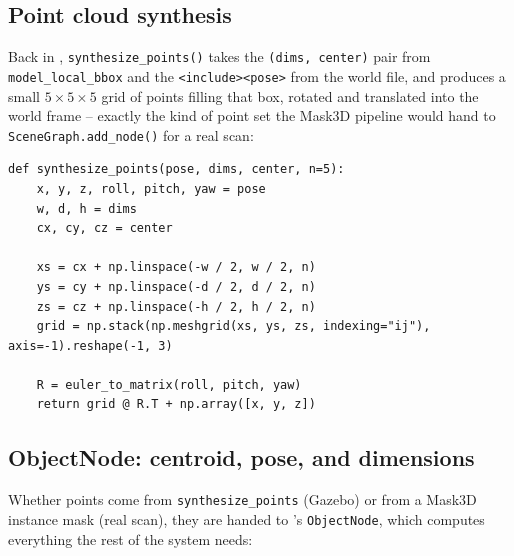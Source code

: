 \documentclass[11pt]{article}
\begin{document}
\subsection{Point cloud synthesis}
\label{sec:synth}

Back in , \texttt{synthesize\_points()}
takes the \texttt{(dims, center)} pair from \texttt{model\_local\_bbox} and the
\texttt{<include><pose>} from the world file, and produces a small
$5\times5\times5$ grid of points filling that box, rotated and translated into
the world frame -- exactly the kind of point set the Mask3D pipeline would
hand to \texttt{SceneGraph.add\_node()} for a real scan:

\begin{lstlisting}[caption={\texttt{build\_scene\_graph\_gazebo.py}: \texttt{synthesize\_points}}]
def synthesize_points(pose, dims, center, n=5):
    x, y, z, roll, pitch, yaw = pose
    w, d, h = dims
    cx, cy, cz = center

    xs = cx + np.linspace(-w / 2, w / 2, n)
    ys = cy + np.linspace(-d / 2, d / 2, n)
    zs = cz + np.linspace(-h / 2, h / 2, n)
    grid = np.stack(np.meshgrid(xs, ys, zs, indexing="ij"), axis=-1).reshape(-1, 3)

    R = euler_to_matrix(roll, pitch, yaw)
    return grid @ R.T + np.array([x, y, z])
\end{lstlisting}

\subsection{ObjectNode: centroid, pose, and dimensions}
\label{sec:objectnode}

Whether points come from \texttt{synthesize\_points} (Gazebo) or from a Mask3D
instance mask (real scan), they are handed to
's \texttt{ObjectNode}, which
computes everything the rest of the system needs:
\end{document}
